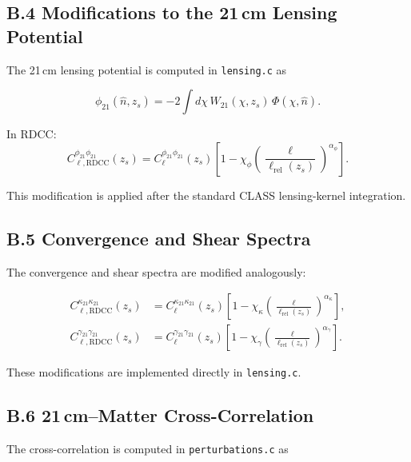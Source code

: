 \documentclass[11pt,a4paper]{article}
\begin{document}
\subsection*{B.4 Modifications to the 21\,cm Lensing Potential}

The 21\,cm lensing potential is computed in \texttt{lensing.c} as


\[
\phi_{21}(\hat{n},z_{s})
=
-2\int d\chi\,W_{21}(\chi,z_{s})\,\Phi(\chi,\hat{n}).
\]



In RDCC:
\begin{equation}
C_{\ell,\mathrm{RDCC}}^{\phi_{21}\phi_{21}}(z_{s})
=
C_{\ell}^{\phi_{21}\phi_{21}}(z_{s})
\left[
1
-
\chi_{\phi}
\left(
\frac{\ell}{\ell_{\mathrm{rel}}(z_{s})}
\right)^{\alpha_{\phi}}
\right].
\end{equation}

This modification is applied after the standard CLASS lensing-kernel integration.

\subsection*{B.5 Convergence and Shear Spectra}

The convergence and shear spectra are modified analogously:

\begin{align}
C_{\ell,\mathrm{RDCC}}^{\kappa_{21}\kappa_{21}}(z_{s})
&=
C_{\ell}^{\kappa_{21}\kappa_{21}}(z_{s})
\left[
1
-
\chi_{\kappa}
\left(
\frac{\ell}{\ell_{\mathrm{rel}}(z_{s})}
\right)^{\alpha_{\kappa}}
\right], \\
C_{\ell,\mathrm{RDCC}}^{\gamma_{21}\gamma_{21}}(z_{s})
&=
C_{\ell}^{\gamma_{21}\gamma_{21}}(z_{s})
\left[
1
-
\chi_{\gamma}
\left(
\frac{\ell}{\ell_{\mathrm{rel}}(z_{s})}
\right)^{\alpha_{\gamma}}
\right].
\end{align}

These modifications are implemented directly in \texttt{lensing.c}.

\subsection*{B.6 21\,cm–Matter Cross-Correlation}

The cross-correlation is computed in \texttt{perturbations.c} as
\end{document}
